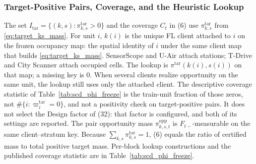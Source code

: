 \subsubsection{Target-Positive Pairs, Coverage, and the Heuristic Lookup}
\label{app:itar_lookup}
The set $I_{\mathrm{tar}}=\{(k,s):\pi^{\mathrm{tar}}_{k,s}>0\}$ and the
coverage $C_t$ in (6) use $\pi^{\mathrm{tar}}_{k,s}$ from
\eqref{eq:target_ks_mass}.  For unit $i$, $k(i)$ is the unique FL client
attached to $i$ on the frozen occupancy map: the spatial identity of $i$
under the same client map that builds \eqref{eq:target_ks_mass}.
SensorScope and U-Air attach stations; T-Drive and City Scanner attach
occupied cells.  The lookup is $\pi^{\mathrm{tar}}(k(i),s(i))$ on
that map; a missing key is $0$.  When several clients realize
opportunity on the same unit, the lookup still uses only the attached
client.  The descriptive coverage statistic of
Table~\ref{tab:scd_phi_freeze} is the train-unit
fraction of those zeros, not $\#\{i:\varpi_i^{\mathrm{tar}}=0\}$, and
not a positivity check on target-positive pairs.  It does not select the
Design factor of (32): that factor is configured, and
both of its settings are reported.
The pair opportunity mass $\pi^{\mathrm{opp}}_{k,s,t}$ is
$F_{t-}$-measurable on the same client--stratum key.
Because $\sum_{k,s}\pi^{\mathrm{tar}}_{k,s}=1$, (6) equals
the ratio of certified mass to total positive target mass.
Per-block lookup constructions and the published coverage statistic are in
Table~\ref{tab:scd_phi_freeze}.

